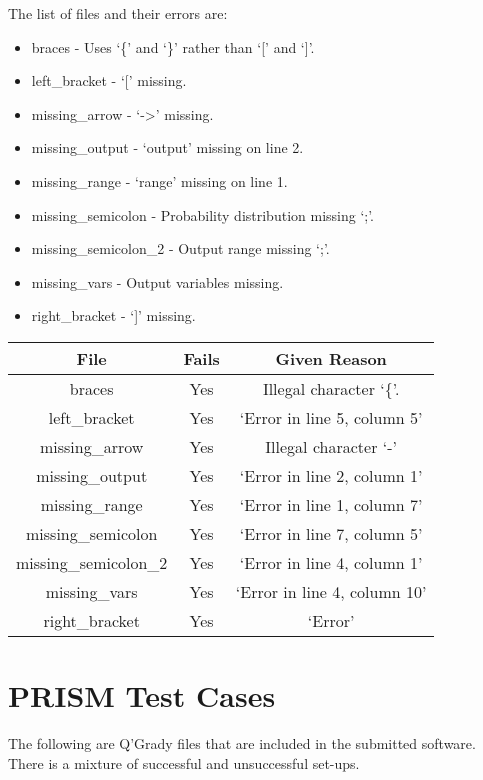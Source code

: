 \documentclass[report.tex]{subfiles}
\begin{document}
The list of files and their errors are:
\begin{itemize}
    \item braces - Uses `\{' and `\}' rather than `[' and `]'.
    \item left\_bracket - `[' missing.
    \item missing\_arrow - `->' missing.
    \item missing\_output - `output' missing on line 2.
    \item missing\_range - `range' missing on line 1.
    \item missing\_semicolon - Probability distribution missing `;'.
    \item missing\_semicolon\_2 - Output range missing `;'.
    \item missing\_vars - Output variables missing.
    \item right\_bracket - `]' missing.
\end{itemize}

\begin{table}[H]
    \centering
    \begin{tabular}{c | c | c}
    File & Fails & Given Reason \\
    \hline
    braces & Yes & Illegal character `\{'. \\
    left\_bracket & Yes & `Error in line 5, column 5' \\
    missing\_arrow & Yes & Illegal character `-' \\
    missing\_output & Yes & `Error in line 2, column 1' \\
    missing\_range & Yes & `Error in line 1, column 7' \\
    missing\_semicolon & Yes & `Error in line 7, column 5' \\
    missing\_semicolon\_2 & Yes & `Error in line 4, column 1' \\
    missing\_vars & Yes & `Error in line 4, column 10' \\
    right\_bracket & Yes & `Error' \\
    \end{tabular}
\end{table}

\section{PRISM Test Cases} %
\label{sec:prism_test_cases}
The following are Q'Grady files that are included in the submitted software.
There is a mixture of successful and unsuccessful set-ups.
\end{document}
